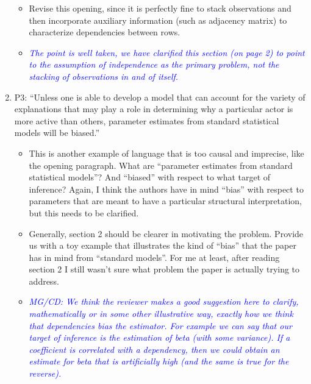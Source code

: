 \begin{enumerate}
	\begin{itemize}
		\item Revise this opening, since it is perfectly fine to stack observations and then incorporate auxiliary information (such as adjacency matrix) to characterize dependencies between rows.
	\end{itemize}
	\begin{itemize}
		\item \textcolor{blue}{ \emph{
		 The point is well taken, we have clarified this section (on page 2) to point to the assumption of independence as the primary problem, not the stacking of observations in and of itself.
		}}
	\end{itemize}
	\item P3: “Unless one is able to develop a model that can account for the variety of explanations that may play a role in determining why a particular actor is more active than others, parameter estimates from standard statistical models will be biased.”
	\begin{itemize}
		\item This is another example of language that is too causal and imprecise, like the opening paragraph. What are “parameter estimates from standard statistical models”?  And “biased” with respect to what target of inference? Again, I think the authors have in mind “bias” with respect to parameters that are meant to have a particular structural interpretation, but this needs to be clarified.
		\item Generally, section 2 should be clearer in motivating the problem.  Provide us with a toy example that illustrates the kind of “bias” that the paper has in mind from “standard models”.  For me at least, after reading section 2 I still wasn’t sure what problem the paper is actually trying to address.
		\item \textcolor{blue}{ \emph{ MG/CD: We think the reviewer makes a good suggestion here to clarify, mathematically or in some other illustrative way, exactly how we think that dependencies bias the estimator. For example we can say that our target of inference is the estimation of beta (with some variance). If a coefficient is correlated with a dependency, then we could obtain an estimate for beta that is artificially high (and the same is true for the reverse).}}
\end{itemize}
\end{enumerate}
